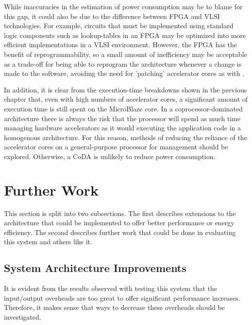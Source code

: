 \documentclass{UoYCSproject}
\begin{document}
While inaccuracies in the estimation of power consumption may be to blame for this gap, it could also be due to
the difference between FPGA and VLSI technologies. For example, circuits that must be implemented using standard
logic components such as lookup-tables in an FPGA may be optimized into more efficient implementations in a VLSI environment.
However, the FPGA has the benefit of reprogrammability, so a small amount of inefficiency may be acceptable as a trade-off for
being able to reprogram the architecture whenever a change is made to the software, avoiding the need for 'patching' accelerator
cores as with \cite{greendroid}.

In addition, it is clear from the execution-time breakdowns shown in the previous chapter that, even with high numbers
of accelerator cores, a significant amount of execution time is still spent on the MicroBlaze core. In a coprocessor-dominated
architecture there is always the risk that the processor will spend as much time managing hardware accelerators as it would
executing the application code in a homogenous architecture. For this reason, methods of reducing the reliance of the
accelerator cores on a general-purpose processor for management should be explored. Otherwise, a CoDA is unlikely to reduce
power consumption.



\section{Further Work}

This section is split into two subsections. The first describes extensions to the architecture that could be implemented
to offer better performance or energy efficiency. The second describes further work that could be done in evaluating this
system and others like it.

\subsection{System Architecture Improvements}

It is evident from the results observed with testing this system that the input/output overheads are too great to
offer significant performance increases. Therefore, it makes sense that ways to decrease these overheads should be investigated.
\end{document}
